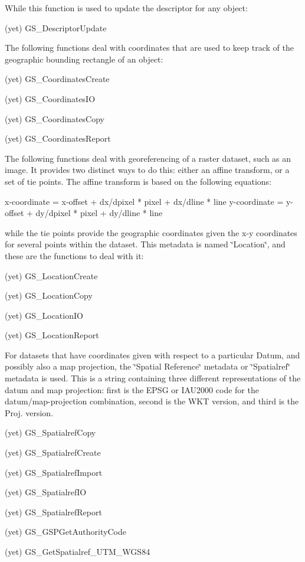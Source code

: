 While this function is used to update the descriptor for any object\+: \begin{DoxyItemize}
\item (yet) G\+S\+\_\+\+Descriptor\+Update\end{DoxyItemize}
The following functions deal with coordinates that are used to keep track of the geographic bounding rectangle of an object\+: \begin{DoxyItemize}
\item (yet) G\+S\+\_\+\+Coordinates\+Create \item (yet) G\+S\+\_\+\+Coordinates\+I\+O \item (yet) G\+S\+\_\+\+Coordinates\+Copy \item (yet) G\+S\+\_\+\+Coordinates\+Report\end{DoxyItemize}
The following functions deal with georeferencing of a raster dataset, such as an image. It provides two distinct ways to do this\+: either an affine transform, or a set of tie points. The affine transform is based on the following equations\+: 
\begin{DoxyCode}
x-coordinate = x-offset + dx/dpixel * pixel + dx/dline * line
y-coordinate = y-offset + dy/dpixel * pixel + dy/dline * line
\end{DoxyCode}
 while the tie points provide the geographic coordinates given the {\ttfamily x-\/y} coordinates for several points within the dataset. This metadata is named \char`\"{}\+Location\char`\"{}, and these are the functions to deal with it\+: \begin{DoxyItemize}
\item (yet) G\+S\+\_\+\+Location\+Create \item (yet) G\+S\+\_\+\+Location\+Copy \item (yet) G\+S\+\_\+\+Location\+I\+O \item (yet) G\+S\+\_\+\+Location\+Report\end{DoxyItemize}
For datasets that have coordinates given with respect to a particular Datum, and possibly also a map projection, the \char`\"{}\+Spatial Reference\char`\"{} metadata or \char`\"{}\+Spatialref\char`\"{} metadata is used. This is a string containing three different representations of the datum and map projection\+: first is the E\+P\+S\+G or I\+A\+U2000 code for the datum/map-\/projection combination, second is the W\+K\+T version, and third is the Proj. version. \begin{DoxyItemize}
\item (yet) G\+S\+\_\+\+Spatialref\+Copy \item (yet) G\+S\+\_\+\+Spatialref\+Create \item (yet) G\+S\+\_\+\+Spatialref\+Import \item (yet) G\+S\+\_\+\+Spatialref\+I\+O \item (yet) G\+S\+\_\+\+Spatialref\+Report \item (yet) G\+S\+\_\+\+G\+S\+P\+Get\+Authority\+Code \item (yet) G\+S\+\_\+\+Get\+Spatialref\+\_\+\+U\+T\+M\+\_\+\+W\+G\+S84\end{DoxyItemize}
